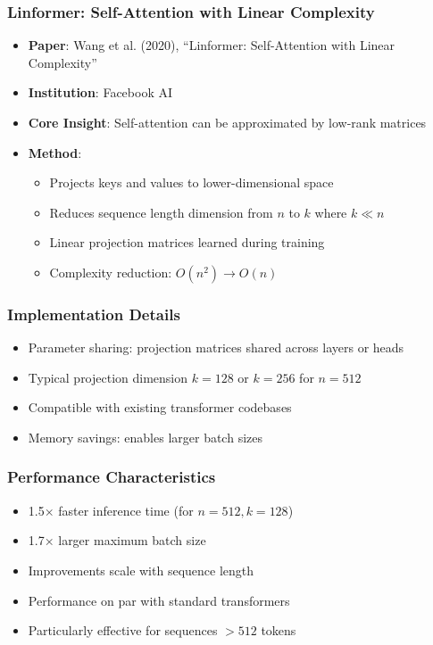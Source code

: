 \documentclass[11pt]{article}
\begin{document}
\subsubsection{Linformer: Self-Attention with Linear Complexity}
\begin{itemize}[leftmargin=*]
    \item \textbf{Paper}: Wang et al. (2020), ``Linformer: Self-Attention with Linear Complexity''~\cite{wang2020linformer}
    \item \textbf{Institution}: Facebook AI
    \item \textbf{Core Insight}: Self-attention can be approximated by low-rank matrices
    \item \textbf{Method}:
    \begin{itemize}
        \item Projects keys and values to lower-dimensional space
        \item Reduces sequence length dimension from $n$ to $k$ where $k \ll n$
        \item Linear projection matrices learned during training
        \item Complexity reduction: $O(n^2) \rightarrow O(n)$
    \end{itemize}
\end{itemize}

\subsubsection{Implementation Details}
\begin{itemize}[leftmargin=*]
    \item Parameter sharing: projection matrices shared across layers or heads
    \item Typical projection dimension $k=128$ or $k=256$ for $n=512$
    \item Compatible with existing transformer codebases
    \item Memory savings: enables larger batch sizes
\end{itemize}

\subsubsection{Performance Characteristics}
\begin{itemize}[leftmargin=*]
    \item 1.5× faster inference time (for $n=512, k=128$)
    \item 1.7× larger maximum batch size
    \item Improvements scale with sequence length
    \item Performance on par with standard transformers
    \item Particularly effective for sequences $> 512$ tokens
\end{itemize}
\end{document}
